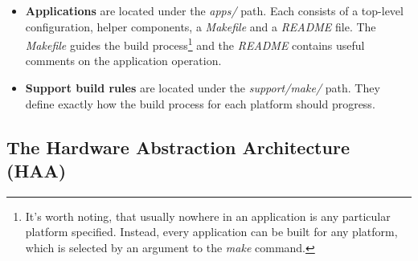 \begin{itemize}
  \item {\bf Applications} are located under the \emph{apps/} path. Each consists of a top-level configuration, helper components, a \emph{Makefile} and a \emph{README} file. The \emph{Makefile} guides the build process\footnote{It's worth noting, that usually nowhere in an application is any particular platform specified. Instead, every application can be built for any platform, which is selected by an argument to the \emph{make} command.} and the \emph{README} contains useful comments on the application operation.

  \item {\bf Support build rules} are located under the \emph{support/make/} path. They define exactly how the build process for each platform should progress.

\end{itemize}

\subsection{The Hardware Abstraction Architecture (HAA)}
\label{haa_arch}

